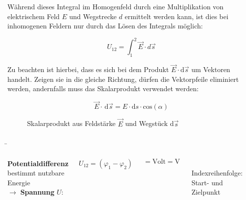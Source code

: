 \begin{frame}
{	Während dieses Integral im Homogenfeld durch eine Multiplikation von elektrischem Feld $E$ und Wegstrecke $d$ ermittelt
	werden kann, ist dies bei inhomogenen Feldern nur durch das Lösen des Integrals möglich:
	
	\begin{equation}
		U_{12} =\int_{1}^{2} \vec{E} \cdot d \vec{s}
	\end{equation}

	Zu beachten ist hierbei, dass es sich bei dem Produkt $\vec{E} \cdot \mathrm{d} \vec{s}$ um Vektoren handelt. Zeigen sie in die
	gleiche Richtung, dürfen die Vektorpfeile eliminiert werden, andernfalls muss das Skalarprodukt verwendet werden: 


		\begin{equation*}
			\vec{E} \cdot \, \mathrm{d} \vec{s} =  E \cdot \mathrm{d} s \cdot \mathrm{cos} (\alpha)
		\end{equation*}


		\begin{figure}[ht]
			\centering
			\caption{Skalarprodukt aus Feldstärke $\vec{E}$ und Wegstück d$\vec{s}$}
			\label{fig:skalarprodukt}
		\end{figure}
	}

	\newpage

	\b{
	\begin{columns}
		\textbf{Potentialdifferenz} bestimmt nutzbare Energie\\
		$\rightarrow$  \textbf{Spannung} $U$: 



		\begin{equation*}
			U_{12} = (\varphi_1 - \varphi_2)
		\end{equation*}

		\begin{equation*}
			[U] = \mathrm{Volt} = \mathrm{V} \, 
		\end{equation*}
		
		\phantom{text}\\

		Indexreihenfolge: Start- und Zielpunkt




		\begin{figure}[ht]
			\centering
			


\end{figure}
\end{columns}}
\end{frame}
